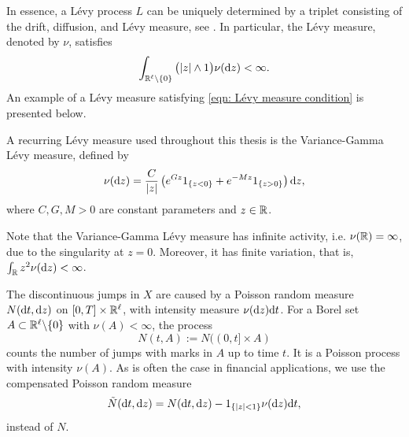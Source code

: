 In essence, a Lévy process $L$ can be uniquely determined by a triplet consisting of the drift, diffusion, and Lévy measure, see \cite{applebaum2009levy}. In particular, the Lévy measure, denoted by $\nu$, satisfies
\begin{equation}
    \int_{\mathbb{R}^\ell \backslash \{0\}} \big( |z| \wedge 1 \big) \nu(\mathrm{d} z) < \infty. 
    \label{eqn: Lévy measure condition}
\end{equation}
An example of a Lévy measure satisfying \eqref{eqn: Lévy measure condition} is presented below. 

\begin{example}
\label{ex: VG measure}
    A recurring Lévy measure used throughout this thesis is the Variance-Gamma Lévy measure, defined by
    \begin{equation}
        \nu(\mathrm{d} z) = \frac{C}{|z|} \left(e^{Gz} 1_{\left\{z<0\right\}} + e^{-Mz} 1_{\left\{z>0\right\}} \right)\mathrm{d} z,
        \label{eqn: VG Levy measure}
    \end{equation}
    where $C,G,M>0$ are constant parameters and $z \in \mathbb{R}$.
\end{example}
\begin{remark}
\label{remark: properties of VG measure}
    Note that the Variance-Gamma Lévy measure has infinite activity, i.e. $\nu(\mathbb{R}) = \infty$, due to the singularity at $z=0$. Moreover, it has finite variation, that is, $\int_{\mathbb{R}} z^2 \nu(\mathrm{d} z) < \infty$.
\end{remark}
The discontinuous jumps in $X$ are caused by a Poisson random measure $N(\mathrm{d} t, \mathrm{d} z)$ on $[0,T]\times \mathbb{R}^\ell$, with intensity measure $\nu(\mathrm{d} z) \mathrm{d} t$. For a Borel set $A \subset \mathbb{R}^\ell \backslash \{0\}$ with $\nu(A)<\infty$, the process
\begin{equation*}
    N(t,A) := N((0,t]\times A)
\end{equation*}
counts the number of jumps with marks in $A$ up to time $t$. It is a Poisson process with intensity $\nu(A)$. As is often the case in financial applications, we use the compensated Poisson random measure
\begin{equation*}
    \tilde N(\mathrm{d} t, \mathrm{d} z) = N(\mathrm{d} t, \mathrm{d} z) - 1_{\left\{|z|<1\right\}}\nu(\mathrm{d} z) \mathrm{d} t,
\end{equation*}
instead of $N$. 

